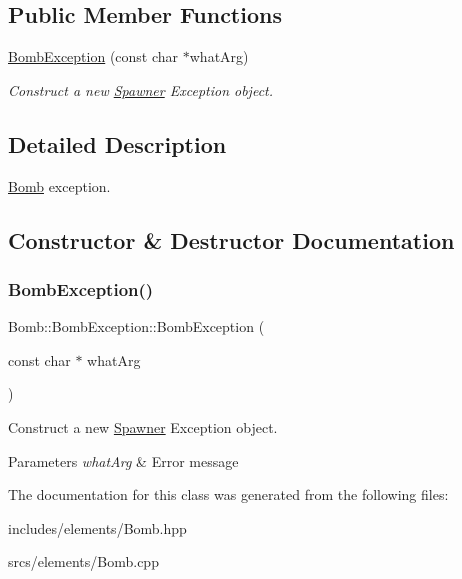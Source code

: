 \subsection*{Public Member Functions}
\begin{DoxyCompactItemize}
\item 
\hyperlink{class_bomb_1_1_bomb_exception_a58bc0c238fe996b749492deec9c77e95}{Bomb\+Exception} (const char $\ast$what\+Arg)
\begin{DoxyCompactList}\small\item\em Construct a new \hyperlink{class_spawner}{Spawner} Exception object. \end{DoxyCompactList}\end{DoxyCompactItemize}


\subsection{Detailed Description}
\hyperlink{class_bomb}{Bomb} exception. 

\subsection{Constructor \& Destructor Documentation}
\mbox{\label{class_bomb_1_1_bomb_exception_a58bc0c238fe996b749492deec9c77e95}} 
\subsubsection{\texorpdfstring{Bomb\+Exception()}{BombException()}}
{\footnotesize\ttfamily Bomb\+::\+Bomb\+Exception\+::\+Bomb\+Exception (\begin{DoxyParamCaption}\item[{const char $\ast$}]{what\+Arg }\end{DoxyParamCaption})\hspace{0.3cm}{\ttfamily [explicit]}}



Construct a new \hyperlink{class_spawner}{Spawner} Exception object. 


\begin{DoxyParams}{Parameters}
{\em what\+Arg} & Error message \\
\hline
\end{DoxyParams}


The documentation for this class was generated from the following files\+:\begin{DoxyCompactItemize}
\item 
includes/elements/Bomb.\+hpp\item 
srcs/elements/Bomb.\+cpp\end{DoxyCompactItemize}
